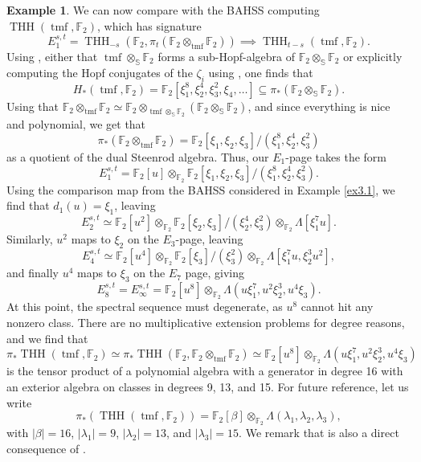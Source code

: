 \documentclass[11pt,leqno]{article}
\newcommand{\sss}{\mathbb{S}}
\newcommand{\fff}{\mathbb{F}}
\DeclareMathOperator{\THH}{THH}
\DeclareMathOperator{\tmf}{tmf}
\newtheorem*{short hand}{theorem name}
\theoremstyle{plain}  %
\theoremstyle{definition}
\newtheorem{example}{Example}[section]
\numberwithin{equation}{section}
\begin{document}
\begin{example}\label{example3.4}  We can now compare with the BAHSS computing $\THH(\tmf,\fff_2)$, which has signature $$E_1^{s,t}=\THH_{-s}(\fff_2,\pi_t(\fff_2\otimes_{\tmf}\fff_2))\implies \THH_{t-s}(\tmf,\fff_2).$$   Using \cite[~Theorem 5.13]{mathew2015homology}, either that $\tmf\otimes_{\sss}\fff_2$ forms a sub-Hopf-algebra of $\fff_2\otimes_{\sss}\fff_2$ or explicitly computing the Hopf conjugates of the $\zeta_i$ using \cite{198669}, one finds that $$H_*(\tmf,\fff_2)=\fff_2[\xi_1^8,\xi_2^4,\xi_3^2,\xi_4,\ldots]\subseteq \pi_*(\fff_2\otimes_{\sss}\fff_2).$$  Using that $\fff_2\otimes_{\tmf}\fff_2\simeq \fff_2\otimes_{\tmf\otimes_{\sss}{\fff_2}}(\fff_2\otimes_{\sss}\fff_2)$, and since everything is nice and polynomial, we get that $$\pi_*(\fff_2\otimes_{\tmf}\fff_2)=\fff_2[\xi_1,\xi_2,\xi_3]/(\xi_1^8,\xi_2^4,\xi_3^2)$$ as a quotient of the dual Steenrod algebra.  Thus, our $E_1$-page takes the form
$$E_1^{s,t}=\fff_2[u]\otimes_{\fff_2}\fff_2[\xi_1,\xi_2,\xi_3]/(\xi_1^8,\xi_2^4,\xi_3^2).$$  
Using the comparison map from the BAHSS considered in Example \ref{ex3.1}, we find that $d_1(u)=\xi_1$, leaving 
$$E_2^{s,t}\simeq \fff_2[u^2]\otimes_{\fff_2}\fff_2[\xi_2,\xi_3]/(\xi_2^4,\xi_3^2)\otimes_{\fff_2}\Lambda[\xi_1^7u].$$
 Similarly, $u^2$ maps to $\xi_2$ on the $E_3$-page, leaving
  $$E_4^{s,t}\simeq \fff_2[u^4]\otimes_{\fff_2}\fff_2[\xi_3]/(\xi_3^2)\otimes_{\fff_2}\Lambda[\xi_1^7u, \xi_2^3 u^2],$$ 
  and finally $u^4$ maps to $\xi_3$ on the $E_7$ page, giving $$E_8^{s,t}=E_{\infty}^{s,t}=\fff_2[u^8]\otimes_{\fff_2}\Lambda(u\xi_1^7, u^2 \xi_2^3, u^4\xi_3).$$ 
  At this point, the spectral sequence must degenerate, as $u^8$ cannot hit any nonzero class.  There are no multiplicative extension problems for degree reasons, and we find that 
  $$\pi_*\THH(\tmf,\fff_2)\simeq \pi_*\THH(\fff_2,\fff_2\otimes_{\tmf}\fff_2)\simeq \fff_2[u^8]\otimes_{\fff_2}\Lambda(u\xi_1^7,u^2\xi_2^3, u^4\xi_3)$$
   is the tensor product of a polynomial algebra with a generator in degree 16 with an exterior algebra on classes in degrees 9, 13, and 15.  For future reference, let us write $$\pi_*(\THH(\tmf,\fff_2))=\fff_2[\beta]\otimes_{\fff_2}\Lambda(\lambda_1,\lambda_2,\lambda_3),$$ with $|\beta|=16$, $|\lambda_1|=9$, $|\lambda_2|=13$, and $|\lambda_3|=15$.  We remark that is also a direct consequence of \cite[~Theorem 6.2(b)]{angeltveit2005hopf}.
\end{example}
\end{document}
